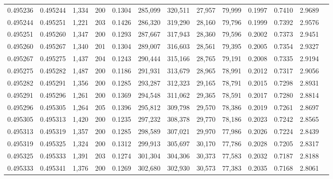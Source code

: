 \begin{tabular}{rrrrrrrrrrrrr}
0.495236 & 0.495244 & 1,334 & 200 &                                     0.1304 & 285,099 & 320,511 &  27,957 &  79,999 & 0.1997 & 0.7410 & 2.9689 \\
0.495244 & 0.495251 & 1,221 & 203 &                                     0.1426 & 286,320 & 319,290 &  28,160 &  79,796 & 0.1999 & 0.7392 & 2.9576 \\
0.495251 & 0.495260 & 1,347 & 200 &                                     0.1293 & 287,667 & 317,943 &  28,360 &  79,596 & 0.2002 & 0.7373 & 2.9451 \\
0.495260 & 0.495267 & 1,340 & 201 &                                     0.1304 & 289,007 & 316,603 &  28,561 &  79,395 & 0.2005 & 0.7354 & 2.9327 \\
0.495267 & 0.495275 & 1,437 & 204 &                                     0.1243 & 290,444 & 315,166 &  28,765 &  79,191 & 0.2008 & 0.7335 & 2.9194 \\
0.495275 & 0.495282 & 1,487 & 200 &                                     0.1186 & 291,931 & 313,679 &  28,965 &  78,991 & 0.2012 & 0.7317 & 2.9056 \\
0.495282 & 0.495291 & 1,356 & 200 &                                     0.1285 & 293,287 & 312,323 &  29,165 &  78,791 & 0.2015 & 0.7298 & 2.8931 \\
0.495291 & 0.495296 & 1,261 & 200 &                                     0.1369 & 294,548 & 311,062 &  29,365 &  78,591 & 0.2017 & 0.7280 & 2.8814 \\
0.495296 & 0.495305 & 1,264 & 205 &                                     0.1396 & 295,812 & 309,798 &  29,570 &  78,386 & 0.2019 & 0.7261 & 2.8697 \\
0.495305 & 0.495313 & 1,420 & 200 &                                     0.1235 & 297,232 & 308,378 &  29,770 &  78,186 & 0.2023 & 0.7242 & 2.8565 \\
0.495313 & 0.495319 & 1,357 & 200 &                                     0.1285 & 298,589 & 307,021 &  29,970 &  77,986 & 0.2026 & 0.7224 & 2.8439 \\
0.495319 & 0.495325 & 1,324 & 200 &                                     0.1312 & 299,913 & 305,697 &  30,170 &  77,786 & 0.2028 & 0.7205 & 2.8317 \\
0.495325 & 0.495333 & 1,391 & 203 &                                     0.1274 & 301,304 & 304,306 &  30,373 &  77,583 & 0.2032 & 0.7187 & 2.8188 \\
0.495333 & 0.495341 & 1,376 & 200 &                                     0.1269 & 302,680 & 302,930 &  30,573 &  77,383 & 0.2035 & 0.7168 & 2.8061 \\

\end{tabular}

